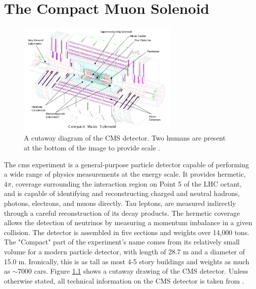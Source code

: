\chapter{The Compact Muon Solenoid}
\label{cms_description_overview}

\begin{figure}[h]
   \centering
  \includegraphics[width=0.7\textwidth]{Figures/CMS_Diagrams/CMS__Complete_Labelled.pdf}
  \caption{A cutaway diagram of the CMS detector.  Two humans are
    present at the bottom of the image to provide scale \cite{CMS:CMS_Machine_Chatrchyan:2008aa}.} \label{fig:cms_complete}
\end{figure}

\par The \acrfull{cms} experiment is a general-purpose particle
detector capable of performing a wide range of physics measurements at
the \TeV energy scale.  It provides hermetic, $4\pi$, coverage
surrounding the interaction region on Point 5 of the LHC octant, and
is capable of identifying and reconstructing charged and neutral
hadrons, photons, electrons, and muons directly.  Tau leptons, are
measured indirectly through a careful reconstruction of its decay
products.  The hermetic coverage allows the detection of neutrinos by
measuring a momentum imbalance in a given collision.  The detector is
assembled in five sections and weights over 14,000 tons.  The
"Compact" part of the experiment's name comes from its relatively
small volume for a modern particle detector, with length of 28.7 m
and a diameter of 15.0 m.  Ironically, this is as tall as most 4-5
story buildings and weights as much as $\sim$7000 cars.  Figure
\ref{fig:cms_complete} shows a cutaway drawing of the CMS detector.
Unless otherwise stated, all technical information on the CMS detector
is taken from \cite{CMS:CMS_Machine_Chatrchyan:2008aa}.  

